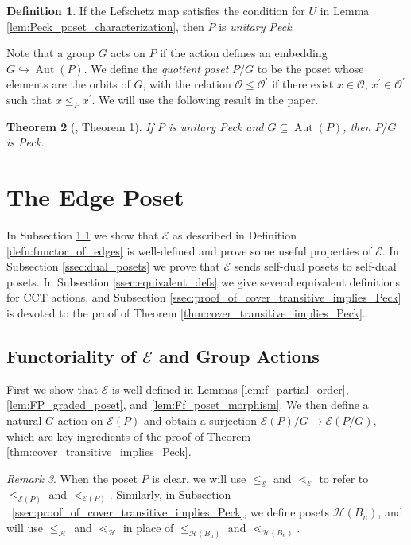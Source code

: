 \documentclass[smallextended, envcountsame, numbook]{svjour3}
\theoremstyle{plain}
\newtheorem{thm}{Theorem}[section]
\theoremstyle{definition}
\newtheorem{defn}[thm]{Definition}
\theoremstyle{remark}
\newtheorem{rmk}[thm]{Remark}
\numberwithin{equation}{section}
\newcommand\ssec{\subsection}
\newcommand\Aut{\operatorname{Aut}}
\begin{document}
\begin{defn}
If the Lefschetz map satisfies the condition for $U$ in Lemma \ref{lem:Peck_poset_characterization}, then $P$ is \textit{unitary Peck}.
\end{defn}

Note that a group $G$ acts on $P$ if the action defines an embedding $G\hookrightarrow \Aut(P)$. We define the \textit{quotient poset} $P/G$ to be the poset whose elements are the orbits of $G$, with the relation $\mathcal{O}\le \mathcal{O}^\prime$ if there exist $x\in \mathcal{O}$, $x^\prime\in \mathcal{O}^\prime$ such that $x\le_{P} x^\prime$.  We will use the following result in the paper.

\begin{thm}[\cite{quotients_stanley}, Theorem 1]
\label{thm:quotients_of_unitary_peck_posets}
If $P$ is unitary Peck and $G\subseteq\Aut(P)$, then $P/G$ is Peck.
\end{thm}



\section{The Edge Poset}
\label{sec:functor_of_edges}

In Subsection \ref{ssec:functoriality} we show that $\mathcal E$ as described in Definition \ref{defn:functor_of_edges} is well-defined and prove some useful properties of $\mathcal E$.  In Subsection \ref{ssec:dual_posets} we prove that $\mathcal{E}$ sends self-dual posets to self-dual posets.  In Subsection \ref{ssec:equivalent_defs} we give several equivalent definitions for CCT actions, and Subsection \ref{ssec:proof_of_cover_transitive_implies_Peck} is devoted to the proof of Theorem \ref{thm:cover_transitive_implies_Peck}.

\ssec{Functoriality of $\mathcal E$ and Group Actions}
\label{ssec:functoriality}
First we show that $\mathcal{E}$ is well-defined in Lemmas \ref{lem:f_partial_order}, \ref{lem:FP_graded_poset}, and \ref{lem:Ff_poset_morphism}.  We then define a natural $G$ action on $\mathcal E(P)$ and obtain a surjection $\mathcal E(P)/G\rightarrow \mathcal E(P/G)$, which are key ingredients of the proof of Theorem \ref{thm:cover_transitive_implies_Peck}.

\begin{rmk}
When the poset $P$ is clear, we will use $\leq_{\mathcal E}$ and $\lessdot_{\mathcal E}$ to refer to $\leq_{\mathcal E(P)}$ and $\lessdot_{\mathcal E(P)}$. Similarly, in Subsection ~\ref{ssec:proof_of_cover_transitive_implies_Peck}, we define posets $\mathcal H(B_n)$, and will use $\leq_{\mathcal H}$ and $\lessdot_{\mathcal H}$ in place of $\leq_{\mathcal H(B_n)}$ and $\lessdot_{\mathcal H(B_n)}$.
\end{rmk}
\end{document}
